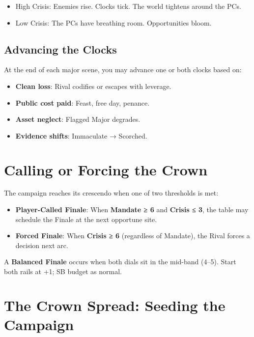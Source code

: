 \begin{itemize}
    \item High Crisis: Enemies rise. Clocks tick. The world tightens around the PCs.
    \item Low Crisis: The PCs have breathing room. Opportunities bloom.
\end{itemize}

\subsection*{Advancing the Clocks}

At the end of each major scene, you may advance one or both clocks based on:

\begin{itemize}
    \item \textbf{Clean loss}: Rival codifies or escapes with leverage.
    \item \textbf{Public cost paid}: Feast, free day, penance.
    \item \textbf{Asset neglect}: Flagged Major degrades.
    \item \textbf{Evidence shifts}: Immaculate → Scorched.
\end{itemize}

\section*{Calling or Forcing the Crown}

The campaign reaches its crescendo when one of two thresholds is met:

\begin{itemize}
    \item \textbf{Player-Called Finale}: When \textbf{Mandate ≥ 6} and \textbf{Crisis ≤ 3}, the table may schedule the Finale at the next opportune site.
    \item \textbf{Forced Finale}: When \textbf{Crisis ≥ 6} (regardless of Mandate), the Rival forces a decision next arc.
\end{itemize}

A \textbf{Balanced Finale} occurs when both dials sit in the mid-band (4--5). Start both rails at +1; SB budget as normal.

\section*{The Crown Spread: Seeding the Campaign}

